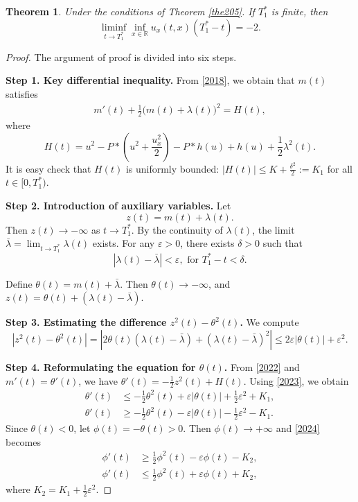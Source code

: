 \documentclass[preprint,12pt]{elsarticle}
\numberwithin{equation}{section}
\newtheorem{theorem}{Theorem}[section]
\begin{document}
\begin{theorem}
\label{the206}
Under the conditions of Theorem \ref{the205}. If $T_{1}^{\ast}$ is finite, then
\begin{equation*}
\liminf_{t\rightarrow T_{1}^{\ast}}\inf_{x\in \mathbb{R}}u_{x}(t,x)(T_{1}^{\ast}-t)=-2.
\end{equation*}
\end{theorem}
\begin{proof}
The argument of proof is divided into six steps.

\noindent\textbf{Step 1. Key differential inequality.}
From \eqref{2018}, we obtain that $m(t)$ satisfies
\begin{align}
m'(t) +\frac{1}{2} \big( m(t) + \lambda(t) \big)^2 = H(t),
\label{2022}
\end{align}
where $$H(t)=u^{2}-P\ast\left(u^{2}+\frac{u_{x}^{2}}{2}\right)
-P\ast h(u)+h(u)+\frac{1}{2}\lambda^{2}(t).$$ It is easy check that $H(t)$ is uniformly bounded: $|H(t)| \leq K+\frac{\delta^{2}}{2}:=K_{1}$ for all $t \in [0, T_{1}^*)$.

\noindent\textbf{Step 2. Introduction of auxiliary variables.}
Let $$z(t) = m(t) + \lambda(t).$$ Then $z(t) \to -\infty$ as $t \to T_{1}^*$. By the continuity of $\lambda(t)$, the limit $\bar\lambda = \lim_{t \to T_{1}^*} \lambda(t)$ exists. For any $\varepsilon > 0$, there exists $\delta > 0$ such that $$|\lambda(t) - \bar\lambda| < \varepsilon,\text{ for }T_{1}^* - t < \delta.$$

Define $\theta(t) = m(t) + \bar\lambda$. Then $\theta(t) \to -\infty$, and $z(t) = \theta(t) + (\lambda(t) - \bar\lambda)$.

\noindent\textbf{Step 3. Estimating the difference $z^2(t) - \theta^2(t)$.}
We compute
\begin{equation}
|z^2(t) - \theta^2(t)| = |2\theta(t)(\lambda(t) - \bar\lambda) + (\lambda(t) - \bar{\lambda})^2|
\leq 2\varepsilon |\theta(t)| + \varepsilon^2.
\label{2023}
\end{equation}


\noindent\textbf{Step 4. Reformulating the equation for $\theta(t)$.}
From \eqref{2022} and $m'(t) = \theta'(t)$, we have
$\theta'(t) = -\frac{1}{2} z^2(t) + H(t).$
Using \eqref{2023}, we obtain
\begin{align}
\theta'(t) &\leq -\frac{1}{2}\theta^2(t) + \varepsilon |\theta(t)| + \frac{1}{2} \varepsilon^2 + K_{1},\nonumber\\
\theta'(t) &\geq -\frac{1}{2}\theta^2(t) - \varepsilon |\theta(t)| -\frac{1}{2} \varepsilon^2 - K_{1}.
\label{2024}
\end{align}
Since $\theta(t) < 0$, let $\phi(t) = -\theta(t) > 0$. Then $\phi(t) \to +\infty$ and \eqref{2024} becomes
\begin{align}
\phi'(t) &\geq \frac{1}{2} \phi^2(t) - \varepsilon \phi(t) - K_2,\nonumber\\
\phi'(t) &\leq \frac{1}{2}\phi^2(t) + \varepsilon \phi(t) + K_2,
\label{2025}
\end{align}
where $K_2 = K_1 + \frac{1}{2} \varepsilon^2$.


\end{proof}
\end{document}
